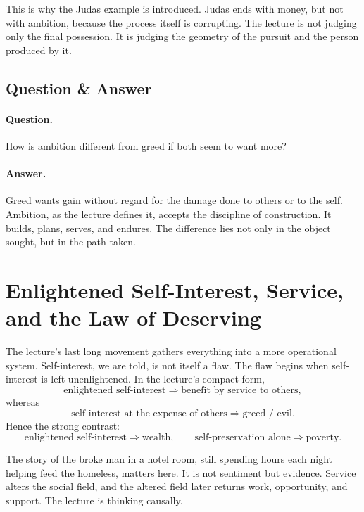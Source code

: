 This is why the Judas example is introduced. Judas ends with money, but not with ambition, because the process itself is corrupting. The lecture is not judging only the final possession. It is judging the geometry of the pursuit and the person produced by it.

\subsection{Question \& Answer}

\paragraph{Question.} How is ambition different from greed if both seem to want more?

\paragraph{Answer.} Greed wants gain without regard for the damage done to others or to the self. Ambition, as the lecture defines it, accepts the discipline of construction. It builds, plans, serves, and endures. The difference lies not only in the object sought, but in the path taken.

\section{Enlightened Self-Interest, Service, and the Law of Deserving}

The lecture's last long movement gathers everything into a more operational system. Self-interest, we are told, is not itself a flaw. The flaw begins when self-interest is left unenlightened. In the lecture's compact form,
\begin{equation}
\text{enlightened self-interest}\Rightarrow \text{benefit by service to others},
\end{equation}
whereas
\begin{equation}
\text{self-interest at the expense of others}\Rightarrow \text{greed / evil}.
\end{equation}
Hence the strong contrast:
\begin{equation}
\text{enlightened self-interest}\Rightarrow \text{wealth},
\qquad
\text{self-preservation alone}\Rightarrow \text{poverty}.
\end{equation}

The story of the broke man in a hotel room, still spending hours each night helping feed the homeless, matters here. It is not sentiment but evidence. Service alters the social field, and the altered field later returns work, opportunity, and support. The lecture is thinking causally.

